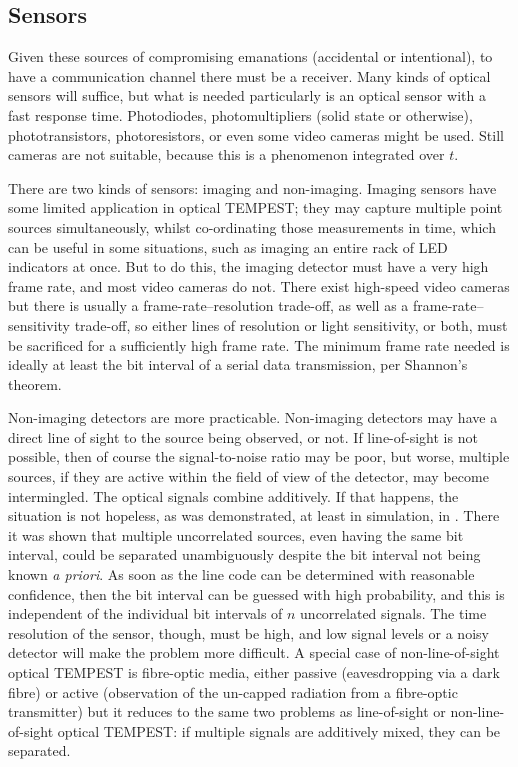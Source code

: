 \documentclass[a4paper,twoside,11pt]{book}
\begin{document}
\subsection{Sensors}
Given these sources of compromising emanations (accidental or intentional), to
have a communication channel there must be a receiver. Many kinds of optical
sensors will suffice, but what is needed particularly is an optical sensor with
a fast response time. Photodiodes, photomultipliers (solid state or otherwise),
phototransistors, photoresistors, or even some video cameras might be used.
Still cameras are not suitable, because this is a phenomenon integrated over
$t$.

There are two kinds of sensors: imaging and non-imaging. Imaging sensors have
some limited application in optical TEMPEST; they may capture multiple point
sources simultaneously, whilst co-ordinating those measurements in time, which
can be useful in some situations, such as imaging an entire rack of LED
indicators at once. But to do this, the imaging detector must have a very high
frame rate, and most video cameras do not. There exist high-speed video cameras
but there is usually a frame-rate--resolution trade-off, as well as a
frame-rate--sensitivity trade-off, so either lines of resolution or light
sensitivity, or both, must be sacrificed for a sufficiently high frame rate.
The minimum frame rate needed is ideally at least the bit interval of a serial
data transmission, per Shannon's theorem.

Non-imaging detectors are more practicable. Non-imaging detectors may have a
direct line of sight to the source being observed, or not. If line-of-sight is
not possible, then of course the signal-to-noise ratio may be poor, but worse,
multiple sources, if they are active within the field of view of the detector,
may become intermingled. The optical signals combine additively. If that
happens, the situation is not hopeless, as was demonstrated, at least in
simulation, in \cite[\S 8]{Loughry2002a}. There it was shown that multiple
uncorrelated sources, even having the same bit interval, could be separated
unambiguously despite the bit interval not being known {\it a priori}. As soon
as the line code can be determined with reasonable confidence, then the bit
interval can be guessed with high probability, and this is independent of the
individual bit intervals of $n$ uncorrelated signals. The time resolution of
the sensor, though, must be high, and low signal levels or a noisy detector
will make the problem more difficult. A special case of non-line-of-sight
optical TEMPEST is fibre-optic media, either passive (eavesdropping via a dark
fibre) or active (observation of the un-capped radiation from a fibre-optic
transmitter) but it reduces to the same two problems as line-of-sight or
non-line-of-sight optical TEMPEST: if multiple signals are additively mixed,
they can be separated.
\end{document}
